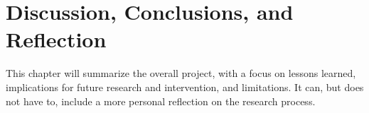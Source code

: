 \chapter{Discussion, Conclusions, and Reflection}

This chapter will  summarize the overall project, with a focus on lessons learned, implications for future research and intervention, and limitations. It can, but does not have to, include a more personal reflection on the research process. 


